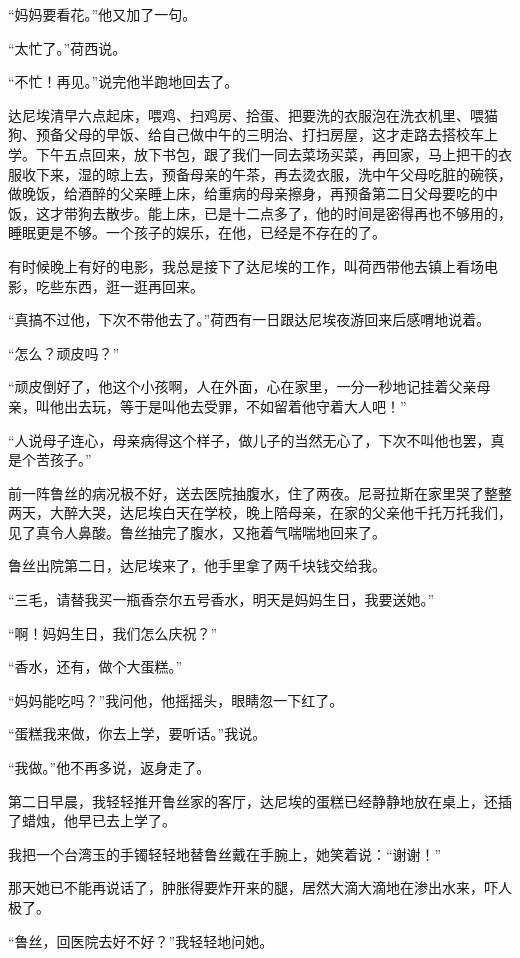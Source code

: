 \par “妈妈要看花。”他又加了一句。
\par “太忙了。”荷西说。
\par “不忙！再见。”说完他半跑地回去了。
\par 达尼埃清早六点起床，喂鸡、扫鸡房、拾蛋、把要洗的衣服泡在洗衣机里、喂猫狗、预备父母的早饭、给自己做中午的三明治、打扫房屋，这才走路去搭校车上学。下午五点回来，放下书包，跟了我们一同去菜场买菜，再回家，马上把干的衣服收下来，湿的晾上去，预备母亲的午茶，再去烫衣服，洗中午父母吃脏的碗筷，做晚饭，给酒醉的父亲睡上床，给重病的母亲擦身，再预备第二日父母要吃的中饭，这才带狗去散步。能上床，已是十二点多了，他的时间是密得再也不够用的，睡眠更是不够。一个孩子的娱乐，在他，已经是不存在的了。
\par 有时候晚上有好的电影，我总是接下了达尼埃的工作，叫荷西带他去镇上看场电影，吃些东西，逛一逛再回来。
\par “真搞不过他，下次不带他去了。”荷西有一日跟达尼埃夜游回来后感喟地说着。
\par “怎么？顽皮吗？”
\par “顽皮倒好了，他这个小孩啊，人在外面，心在家里，一分一秒地记挂着父亲母亲，叫他出去玩，等于是叫他去受罪，不如留着他守着大人吧！”
\par “人说母子连心，母亲病得这个样子，做儿子的当然无心了，下次不叫他也罢，真是个苦孩子。”
\par 前一阵鲁丝的病况极不好，送去医院抽腹水，住了两夜。尼哥拉斯在家里哭了整整两天，大醉大哭，达尼埃白天在学校，晚上陪母亲，在家的父亲他千托万托我们，见了真令人鼻酸。鲁丝抽完了腹水，又拖着气喘喘地回来了。
\par 鲁丝出院第二日，达尼埃来了，他手里拿了两千块钱交给我。
\par “三毛，请替我买一瓶香奈尔五号香水，明天是妈妈生日，我要送她。”
\par “啊！妈妈生日，我们怎么庆祝？”
\par “香水，还有，做个大蛋糕。”
\par “妈妈能吃吗？”我问他，他摇摇头，眼睛忽一下红了。
\par “蛋糕我来做，你去上学，要听话。”我说。
\par “我做。”他不再多说，返身走了。
\par 第二日早晨，我轻轻推开鲁丝家的客厅，达尼埃的蛋糕已经静静地放在桌上，还插了蜡烛，他早已去上学了。
\par 我把一个台湾玉的手镯轻轻地替鲁丝戴在手腕上，她笑着说：“谢谢！”
\par 那天她已不能再说话了，肿胀得要炸开来的腿，居然大滴大滴地在渗出水来，吓人极了。
\par “鲁丝，回医院去好不好？”我轻轻地问她。
